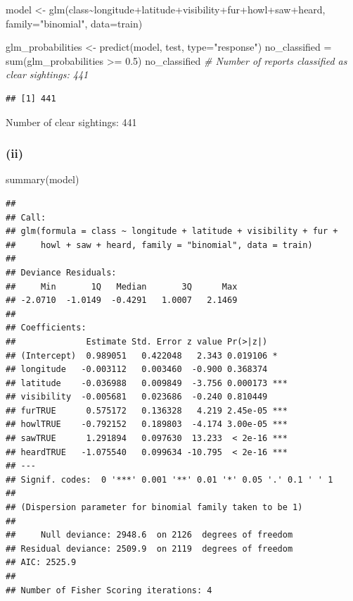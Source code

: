 \documentclass[
]{article}
\newenvironment{Shaded}{\begin{snugshade}}{\end{snugshade}}
\newcommand{\AttributeTok}[1]{\textcolor[rgb]{0.77,0.63,0.00}{#1}}
\newcommand{\CommentTok}[1]{\textcolor[rgb]{0.56,0.35,0.01}{\textit{#1}}}
\newcommand{\FloatTok}[1]{\textcolor[rgb]{0.00,0.00,0.81}{#1}}
\newcommand{\FunctionTok}[1]{\textcolor[rgb]{0.00,0.00,0.00}{#1}}
\newcommand{\NormalTok}[1]{#1}
\newcommand{\OtherTok}[1]{\textcolor[rgb]{0.56,0.35,0.01}{#1}}
\newcommand{\SpecialCharTok}[1]{\textcolor[rgb]{0.00,0.00,0.00}{#1}}
\newcommand{\StringTok}[1]{\textcolor[rgb]{0.31,0.60,0.02}{#1}}
\begin{document}
\begin{Shaded}
\begin{Highlighting}[]
\NormalTok{model }\OtherTok{\textless{}{-}} \FunctionTok{glm}\NormalTok{(class}\SpecialCharTok{\textasciitilde{}}\NormalTok{longitude}\SpecialCharTok{+}\NormalTok{latitude}\SpecialCharTok{+}\NormalTok{visibility}\SpecialCharTok{+}\NormalTok{fur}\SpecialCharTok{+}\NormalTok{howl}\SpecialCharTok{+}\NormalTok{saw}\SpecialCharTok{+}\NormalTok{heard, }\AttributeTok{family=}\StringTok{"binomial"}\NormalTok{, }\AttributeTok{data=}\NormalTok{train)}

\NormalTok{glm\_probabilities }\OtherTok{\textless{}{-}} \FunctionTok{predict}\NormalTok{(model, test, }\AttributeTok{type=}\StringTok{"response"}\NormalTok{)}
\NormalTok{no\_classified }\OtherTok{=} \FunctionTok{sum}\NormalTok{(glm\_probabilities }\SpecialCharTok{\textgreater{}=} \FloatTok{0.5}\NormalTok{)}
\NormalTok{no\_classified }\CommentTok{\# Number of reports classified as clear sightings: 441}
\end{Highlighting}
\end{Shaded}

\begin{verbatim}
## [1] 441
\end{verbatim}

Number of clear sightings: 441

\hypertarget{ii-2}{%
\subsubsection{(ii)}\label{ii-2}}

\begin{Shaded}
\begin{Highlighting}[]
\FunctionTok{summary}\NormalTok{(model)}
\end{Highlighting}
\end{Shaded}

\begin{verbatim}
## 
## Call:
## glm(formula = class ~ longitude + latitude + visibility + fur + 
##     howl + saw + heard, family = "binomial", data = train)
## 
## Deviance Residuals: 
##     Min       1Q   Median       3Q      Max  
## -2.0710  -1.0149  -0.4291   1.0007   2.1469  
## 
## Coefficients:
##              Estimate Std. Error z value Pr(>|z|)    
## (Intercept)  0.989051   0.422048   2.343 0.019106 *  
## longitude   -0.003112   0.003460  -0.900 0.368374    
## latitude    -0.036988   0.009849  -3.756 0.000173 ***
## visibility  -0.005681   0.023686  -0.240 0.810449    
## furTRUE      0.575172   0.136328   4.219 2.45e-05 ***
## howlTRUE    -0.792152   0.189803  -4.174 3.00e-05 ***
## sawTRUE      1.291894   0.097630  13.233  < 2e-16 ***
## heardTRUE   -1.075540   0.099634 -10.795  < 2e-16 ***
## ---
## Signif. codes:  0 '***' 0.001 '**' 0.01 '*' 0.05 '.' 0.1 ' ' 1
## 
## (Dispersion parameter for binomial family taken to be 1)
## 
##     Null deviance: 2948.6  on 2126  degrees of freedom
## Residual deviance: 2509.9  on 2119  degrees of freedom
## AIC: 2525.9
## 
## Number of Fisher Scoring iterations: 4
\end{verbatim}
\end{document}
